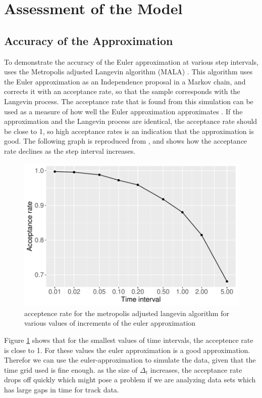 \section{Assessment of the Model}

\subsection{Accuracy of the Approximation}
To demonstrate the accuracy of the Euler approximation at various step intervals, \cite{michelot_langevin_2019} uses the Metropolis adjusted Langevin algorithm (MALA) \cite{roberts_exponential_1996}. This algorithm uses the Euler approximation as an Independence proposal in a Markov chain, and corrects it with an acceptance rate, so that the sample corresponds with the Langevin process. The acceptance rate that is found from this simulation can be used as a measure of how well the Euler approximation approximates  . If the approximation and the Langevin process are identical, the acceptance rate should be close to 1, so high acceptance rates is an indication that the approximation is good. The following graph is reproduced from \cite{michelot_langevin_2019}, and shows how the acceptance rate declines as the step interval increases.

\begin{figure}[H]
    \centering
    \includegraphics[width=\linewidth]{Images/example1/MALArates.pdf}
    \caption[example 1 covariates]{acceptence rate for the metropolis adjusted langevin algorithm for various values of increments of the euler approximation}
    \label{fig:MALA}
\end{figure}


Figure \ref{fig:MALA} shows that for the smallest values of time intervals, the acceptence rate is close to 1. For these values the euler approximation is a good approximation. Therefor we can use the euler-approximation to simulate the data, given that the time grid used is fine enough. as the size of $\Delta_t$ increases, the acceptance rate drops off quickly which might pose a problem if we are analyzing data sets which has large gaps in time for track data. 

